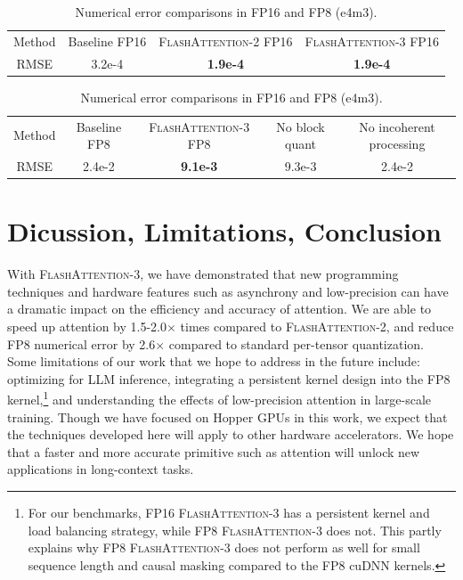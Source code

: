 \begin{table}[h!]
  \centering
  \caption{Numerical error comparisons in FP16 and FP8 (e4m3).}
  \label{table:numerical_error}
  \begin{tabular}{|c|ccc|}
      \hline
      Method & Baseline FP16 & \textsc{FlashAttention-2} FP16 & \textsc{FlashAttention-3} FP16 \\
      RMSE & 3.2e-4 & \textbf{1.9e-4} & \textbf{1.9e-4} \\
      \hline
  \end{tabular}

  \begin{tabular}{|c|cccc|}
      \hline
      Method & Baseline FP8 & \textsc{FlashAttention-3} FP8 & No block quant & No incoherent processing \\
      RMSE & 2.4e-2 & \textbf{9.1e-3} & 9.3e-3 & 2.4e-2 \\
      \hline
  \end{tabular}
\end{table}

\section{Dicussion, Limitations, Conclusion}
\label{sec:discussion}

With \textsc{FlashAttention-3}, we have demonstrated that new programming techniques and hardware features such as asynchrony and low-precision can have a dramatic impact on the efficiency and accuracy of attention. We are able to speed up attention by 1.5-2.0$\times$ times compared to \textsc{FlashAttention-2}, and reduce FP8 numerical error by 2.6$\times$ compared to standard per-tensor quantization. Some limitations of our work that we hope to address in the future include: optimizing for LLM inference, integrating a persistent kernel design into the FP8 kernel,\footnote{For our benchmarks, FP16 \textsc{FlashAttention-3} has a persistent kernel and load balancing strategy, while FP8 \textsc{FlashAttention-3} does not. This partly explains why FP8 \textsc{FlashAttention-3} does not perform as well for small sequence length and causal masking compared to the FP8 cuDNN kernels.} and understanding the effects of low-precision attention in large-scale training. Though we have focused on Hopper GPUs in this work, we expect that the techniques developed here will apply to other hardware accelerators. We hope that a faster and more accurate primitive such as attention will unlock new applications in long-context tasks.

